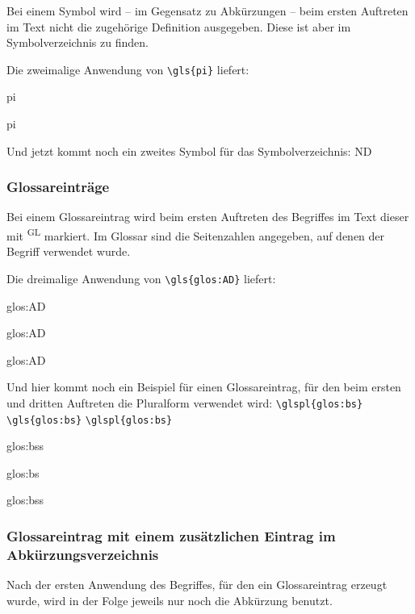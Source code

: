 Bei einem Symbol wird -- im Gegensatz zu Abk\"urzungen -- beim ersten Auftreten im Text nicht die 
zugeh\"orige Definition ausgegeben. Diese ist aber im Symbolverzeichnis zu finden.

Die zweimalige Anwendung von \verb+\gls{pi}+ liefert:

\begin{seList}
\item \gls{pi}
\item \gls{pi}
\end{seList}

Und jetzt kommt noch ein zweites Symbol f\"ur das Symbolverzeichnis: \gls{ND}

\subsubsection{Glossareintr\"age}

Bei einem Glossareintrag wird beim ersten Auftreten des Begriffes im Text dieser mit \textsuperscript{GL} markiert.
Im Glossar sind die Seitenzahlen angegeben, auf denen der Begriff verwendet wurde. 

Die dreimalige Anwendung von \verb+\gls{glos:AD}+ liefert:

\begin{seList}
\item \gls{glos:AD}
\item \gls{glos:AD}
\item \gls{glos:AD}
\end{seList}

Und hier kommt noch ein Beispiel f\"ur einen Glossareintrag, f\"ur den beim ersten und dritten Auftreten die Pluralform verwendet 
wird:  \verb+\glspl{glos:bs}+  \verb+\gls{glos:bs}+  \verb+\glspl{glos:bs}+ 

\begin{seList}
\item \glspl{glos:bs}
\item \gls{glos:bs}
\item \glspl{glos:bs}
\end{seList}

\subsubsection{Glossareintrag mit einem zus\"atzlichen Eintrag im Ab\-k\"ur\-zungs\-ver\-zeich\-nis}

Nach der ersten Anwendung des Begriffes, f\"ur den ein Glossareintrag erzeugt wurde, wird in der Folge 
jeweils nur noch die Abk\"urzung benutzt. 


